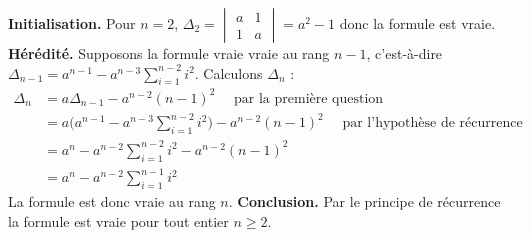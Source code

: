{\begin{enumerate}
{\begin{itemize}
\textbf{Initialisation.} Pour $n=2$,
$\Delta_2=\begin{vmatrix}a&1\\1&a\end{vmatrix}=a^2-1$
donc la formule est vraie.
\textbf{Hérédité.} Supposons la formule vraie vraie au rang $n-1$,
c'est-à-dire $\Delta_{n-1}=a^{n-1}-a^{n-3}\sum_{i=1}^{n-2}{i^2}$.
Calculons $\Delta_n$ :
\begin{align*}
\Delta_n 
  & = a \Delta_{n-1} - a^{n-2}(n-1)^2  \quad \text{ par la première question } \\
  & = a\Big(a^{n-1}-a^{n-3}\sum_{i=1}^{n-2}{i^2} \Big) - a^{n-2}(n-1)^2 \quad \text{ par l'hypothèse de récurrence} \\
  & = a^n -  a^{n-2}\sum_{i=1}^{n-2}{i^2} - a^{n-2}(n-1)^2 \\
  & = a^n-a^{n-2}\sum_{i=1}^{n-1}{i^2}
\end{align*}
La formule est donc vraie au rang $n$.
\textbf{Conclusion.} Par le principe de récurrence la formule est vraie
pour tout entier $n\ge 2$.
\end{itemize}
}
\end{enumerate}
}
